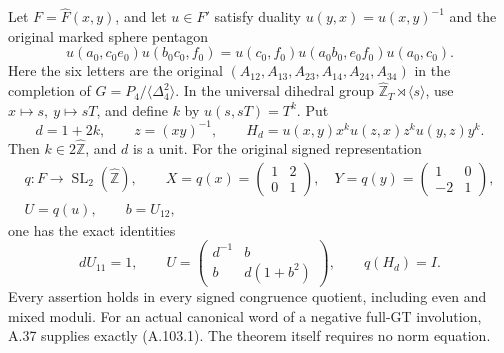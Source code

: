 Let \(F=\widehat F(x,y)\), and let \(u\in F'\) satisfy duality
\(u(y,x)=u(x,y)^{-1}\) and the original marked sphere pentagon
\[
 u(a_0,c_0e_0)u(b_0c_0,f_0)
   =u(c_0,f_0)u(a_0b_0,e_0f_0)u(a_0,c_0).
 \tag{A.103.1}
\]
Here the six letters are the original
\((A_{12},A_{13},A_{23},A_{14},A_{24},A_{34})\) in the
completion of \(G=P_4/\langle\Delta_4^2\rangle\).
In the universal dihedral group
\(\widehat{\mathbb Z}_{T}\rtimes\langle s\rangle\), use
\(x\mapsto s,\ y\mapsto sT\), and define \(k\) by
\(u(s,sT)=T^k\). Put
\[
 d=1+2k,\qquad z=(xy)^{-1},\qquad
 H_d=u(x,y)x^k u(z,x)z^k u(y,z)y^k.
 \tag{A.103.2}
\]
Then \(k\in2\widehat{\mathbb Z}\), and \(d\) is a unit.
For the original signed representation
\[
 \begin{gathered}
 q:F\longrightarrow\operatorname{SL}_2(\widehat{\mathbb Z}),
 \qquad
 X=q(x)=\begin{pmatrix}1&2\\0&1\end{pmatrix},\quad
 Y=q(y)=\begin{pmatrix}1&0\\-2&1\end{pmatrix},\\
 U=q(u),\qquad b=U_{12},
 \end{gathered}
 \tag{A.103.3}
\]
one has the exact identities
\[
 dU_{11}=1,\qquad
 U=\begin{pmatrix}d^{-1}&b\\b&d(1+b^2)\end{pmatrix},
 \qquad q(H_d)=I.
 \tag{A.103.4}
\]
Every assertion holds in every signed congruence quotient, including
even and mixed moduli. For an actual canonical word of a negative
full-GT involution, A.37 supplies exactly (A.103.1).
The theorem itself requires no norm equation.

